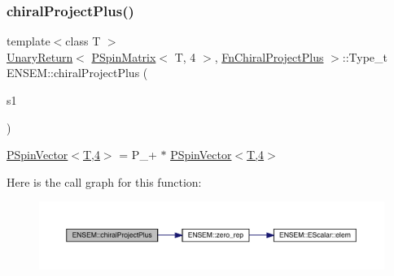 \subsubsection{\texorpdfstring{chiralProjectPlus()}{chiralProjectPlus()}}
{\footnotesize\ttfamily template$<$class T $>$ \\
\mbox{\hyperlink{structENSEM_1_1UnaryReturn}{Unary\+Return}}$<$ \mbox{\hyperlink{classENSEM_1_1PSpinMatrix}{P\+Spin\+Matrix}}$<$ T, 4 $>$, \mbox{\hyperlink{structENSEM_1_1FnChiralProjectPlus}{Fn\+Chiral\+Project\+Plus}} $>$\+::Type\+\_\+t E\+N\+S\+E\+M\+::chiral\+Project\+Plus (\begin{DoxyParamCaption}\item[{const \mbox{\hyperlink{classENSEM_1_1PSpinMatrix}{P\+Spin\+Matrix}}$<$ T, 4 $>$ \&}]{s1 }\end{DoxyParamCaption})\hspace{0.3cm}{\ttfamily [inline]}}



\mbox{\hyperlink{classENSEM_1_1PSpinVector_3_01T_00_014_01_4}{P\+Spin\+Vector$<$\+T,4$>$}} = P\+\_\++ $\ast$ \mbox{\hyperlink{classENSEM_1_1PSpinVector_3_01T_00_014_01_4}{P\+Spin\+Vector$<$\+T,4$>$}} 

Here is the call graph for this function\+:\nopagebreak
\begin{figure}[H]
\begin{center}
\leavevmode
\includegraphics[width=350pt]{d6/df5/group__primspinmatrix_ga6005e8f3442735f70e74a218c3d5a141_cgraph}
\end{center}
\end{figure}
\mbox{\label{group__primspinmatrix_ga3c278ae3c7e7dc6db3a144f463999af2}} 
